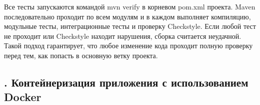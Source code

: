 {\par \redline Все тесты запускаются командой mvn verify в корневом pom.xml проекта. Maven последовательно проходит по всем модулям и в каждом выполняет компиляцию, модульные тесты, интеграционные тесты и проверку Checkstyle. Если любой тест не проходит или Checkstyle находит нарушения, сборка считается неудачной. Такой подход гарантирует, что любое изменение кода проходит полную проверку перед тем, как попасть в основную ветку проекта.

\par
}

\subtitlespace

\subsection*{
\gostTitleFont
\redline
\thechaptercntr .\thesubchaptercntr \spc
Контейнеризация приложения с использованием Docker
} \addtocounter{subchaptercntr}{1}

\subtitlespace

